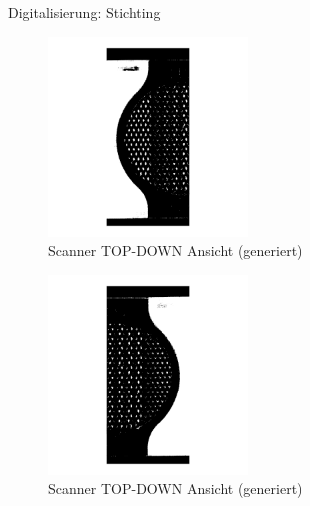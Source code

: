 \documentclass[../slides.tex]{subfiles}
\begin{document}
  \begin{frame}{Digitalisierung: Stichting}
    \begin{minipage}[h]{.49\textwidth}
        \begin{figure}[]
            \includegraphics[width=150pt]{img_niklas/scanner_2.png}
            \caption[short]{Scanner TOP-DOWN Ansicht (generiert)}
          \end{figure}
    \end{minipage}
    \hfill
    \begin{minipage}[h]{.49\textwidth}
      \begin{figure}[]
        \includegraphics[width=150pt]{img_niklas/scanner_1.png}
        \caption[short]{Scanner TOP-DOWN Ansicht (generiert)}
      \end{figure}
    \end{minipage}
  \end{frame}
\end{document}
